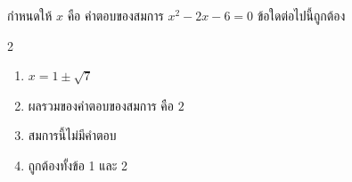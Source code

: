 \newpage
\begin{examplebox}
กำหนดให้ $x$ คือ คำตอบของสมการ $x^2-2 x-6=0$ ข้อใดต่อไปนี้ถูกต้อง
\begin{multicols}{2}
\begin{enumerate}
\item $x=1 \pm \sqrt{7}$
\item ผลรวมของคำตอบของสมการ คือ $2$
\item สมการนี้ไม่มีคำตอบ
\item ถูกต้องทั้งข้อ 1 และ 2
\end{enumerate}
\end{multicols}
\end{examplebox}